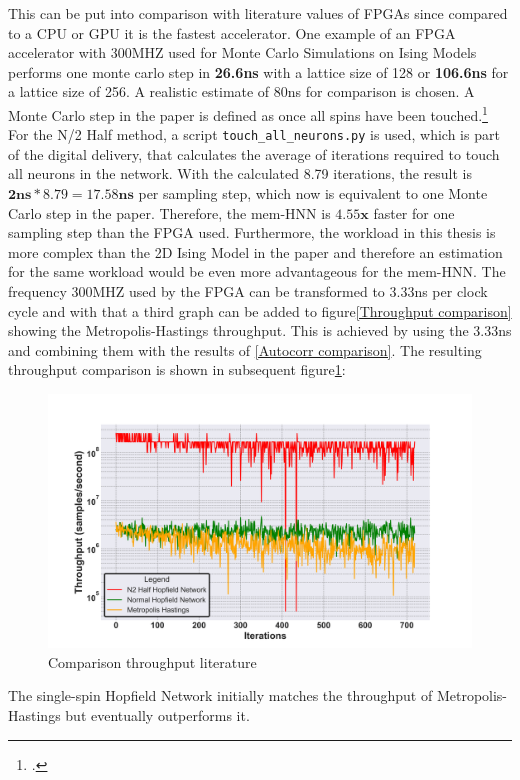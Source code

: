 This can be put into comparison with literature values of \ac{FPGA}s since compared to a \ac{CPU} or \ac{GPU} it is the fastest accelerator.
One example of an \ac{FPGA} accelerator with 300MHZ used for Monte Carlo Simulations on Ising Models
performs one monte carlo step in \textbf{26.6ns} with a lattice size of 128 or \textbf{106.6ns} for a lattice size of 256.
A realistic estimate of 80ns for comparison is chosen. 
A Monte Carlo step in the paper is defined as once all spins have been touched.\footcite[cf.][4]{ortega-zamoranoFPGAHardwareAcceleration2016}
For the N/2 Half method, a script \texttt{touch\_all\_neurons.py} is used, which is part of the digital delivery, that calculates  
the average of iterations required to touch all neurons in the network.
With the calculated 8.79 iterations, the result is \(\mathbf{2ns * 8.79 = 17.58ns}\) per sampling step, which now is equivalent to one Monte Carlo step in the paper.
Therefore, the \ac{mem-HNN} is \(\mathbf{4.55x}\) faster for one sampling step than the \ac{FPGA} used.
Furthermore, the workload in this thesis is more complex than the 2D Ising Model in the paper and therefore an estimation for the same 
workload would be even more advantageous for the \ac{mem-HNN}. 
The frequency 300MHZ used by the \ac{FPGA} can be transformed to 3.33ns per clock cycle and with that a third graph can be added to figure\ref{Throughput comparison} showing the Metropolis-Hastings throughput.
This is achieved by using the 3.33ns and combining them with the results of \ref{Autocorr comparison}.
The resulting throughput comparison is shown in subsequent figure\ref{Comparison_throughput_literature_3}:
\begin{figure}[H]
    \centering
    \includegraphics[width=0.8\linewidth]{graphics/Visualisierungen_throughput_MODIFIED.png}
    \caption{Comparison throughput literature}
    \label{Comparison_throughput_literature_3}
\end{figure}
The single-spin Hopfield Network initially matches the throughput of Metropolis-Hastings but eventually outperforms it.
